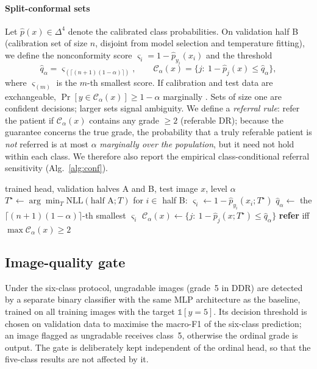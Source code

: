 \paragraph{Split-conformal sets} Let $\hat p(x)\in\Delta^4$ denote the calibrated class probabilities. On validation half B (calibration set of size $n$, disjoint from model selection and temperature fitting), we define the nonconformity score $\varsigma_i=1-\hat p_{y_i}(x_i)$ and the threshold
\begin{equation}
\hat q_\alpha=\varsigma_{(\lceil(n+1)(1-\alpha)\rceil)},\qquad
\mathcal C_\alpha(x)=\{j:\ 1-\hat p_j(x)\le\hat q_\alpha\},
\label{eq:conformal}
\end{equation}
where $\varsigma_{(m)}$ is the $m$-th smallest score. If calibration and test data are exchangeable, $\Pr[y\in\mathcal C_\alpha(x)]\ge1-\alpha$ marginally \citep{vovk2005,angelopoulos2023}. Sets of size one are confident decisions; larger sets signal ambiguity. We define a \emph{referral rule}: refer the patient if $\mathcal C_\alpha(x)$ contains any grade $\ge2$ (referable DR); because the guarantee concerns the true grade, the probability that a truly referable patient is \emph{not} referred is at most $\alpha$ \emph{marginally over the population}, but it need not hold within each class. We therefore also report the empirical class-conditional referral sensitivity (Alg.~\ref{alg:conf}).

\begin{algorithm}[!htbp]
\caption{Calibration and split-conformal referral.}
\label{alg:conf}
\begin{algorithmic}[1]
\Require trained head, validation halves A and B, test image $x$, level $\alpha$
\State $T^\star\gets\arg\min_{T}\mathrm{NLL}(\text{half A};T)$
\State for $i\in$ half B: $\varsigma_i\gets 1-\hat p_{y_i}(x_i;T^\star)$
\State $\hat q_\alpha\gets$ the $\lceil(n+1)(1-\alpha)\rceil$-th smallest $\varsigma_i$
\State $\mathcal C_\alpha(x)\gets\{j:\ 1-\hat p_j(x;T^\star)\le\hat q_\alpha\}$
\State \textbf{refer} iff $\max\mathcal C_\alpha(x)\ge2$
\end{algorithmic}
\end{algorithm}

\subsection{Image-quality gate}
\label{sec:quality}
Under the six-class protocol, ungradable images (grade~5 in DDR) are detected by a separate binary classifier with the same MLP architecture as the baseline, trained on all training images with the target $\mathbb 1[y=5]$. Its decision threshold is chosen on validation data to maximise the macro-F1 of the six-class prediction; an image flagged as ungradable receives class~5, otherwise the ordinal grade is output. The gate is deliberately kept independent of the ordinal head, so that the five-class results are not affected by it.

